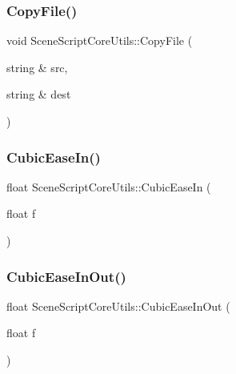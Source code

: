 \hypertarget{class_scene_script_core_utils_af4dece532f9b58b4ee70065ebfa4f103}{}\label{class_scene_script_core_utils_af4dece532f9b58b4ee70065ebfa4f103} 
\subsubsection{\texorpdfstring{Copy\+File()}{CopyFile()}}
{\footnotesize\ttfamily void Scene\+Script\+Core\+Utils\+::\+Copy\+File (\begin{DoxyParamCaption}\item[{string \&}]{src,  }\item[{string \&}]{dest }\end{DoxyParamCaption})}

\hypertarget{class_scene_script_core_utils_a4a27dda78eaf15cc5a8eb00d5d7ea47b}{}\label{class_scene_script_core_utils_a4a27dda78eaf15cc5a8eb00d5d7ea47b} 
\subsubsection{\texorpdfstring{Cubic\+Ease\+In()}{CubicEaseIn()}}
{\footnotesize\ttfamily float Scene\+Script\+Core\+Utils\+::\+Cubic\+Ease\+In (\begin{DoxyParamCaption}\item[{float}]{f }\end{DoxyParamCaption})}

\hypertarget{class_scene_script_core_utils_a1b741fa9594e600a7ed5e3d08882a71f}{}\label{class_scene_script_core_utils_a1b741fa9594e600a7ed5e3d08882a71f} 
\subsubsection{\texorpdfstring{Cubic\+Ease\+In\+Out()}{CubicEaseInOut()}}
{\footnotesize\ttfamily float Scene\+Script\+Core\+Utils\+::\+Cubic\+Ease\+In\+Out (\begin{DoxyParamCaption}\item[{float}]{f }\end{DoxyParamCaption})}

